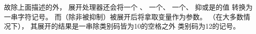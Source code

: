 \documentclass{book}
\begin{document}
故除上面描述的外，
展开处理器还会将一个
、
一个、
一个、
抑或是的值
转换为一串字符记号。
而（除非被抑制）被展开后将拿取变量作为参数。
（在大多数情况下），
其展开的结果是一串除类别码皆为10的空格之外
类别码为12的记号。
\end{document}
